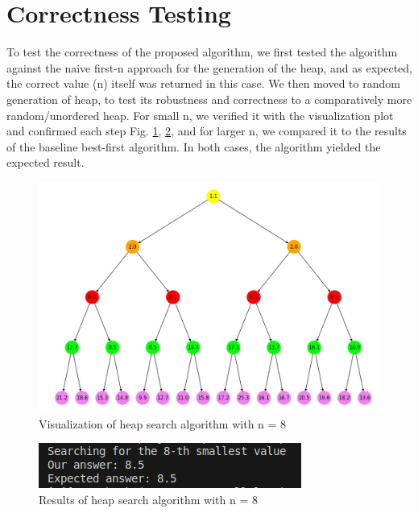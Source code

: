 \documentclass{article}
\begin{document}
\section{Correctness Testing}
To test the correctness of the proposed algorithm, we first tested the algorithm against the naive first-n approach for the generation of the heap, and as expected, the correct value (n) itself was returned in this case. We then moved to random generation of heap, to test its robustness and correctness to a comparatively more random/unordered heap. For small n, we verified it with the visualization plot and confirmed each step Fig. \ref{fig:visualise}, \ref{fig:result}, and for larger n, we compared it to the results of the baseline best-first algorithm. In both cases, the algorithm yielded the expected result. 
\begin{figure}
    \centering
    \includegraphics[width=1\linewidth]{images/algo-visualisation.jpeg}
    \caption{Visualization of heap search algorithm with n = 8}
        \label{fig:visualise}
\end{figure}
\begin{figure}
        \centering
        \includegraphics[width=1\linewidth]{images/algo-result.jpeg}
        \caption{Results of heap search algorithm with n = 8}
    
        \label{fig:result}
\end{figure}
\end{document}
